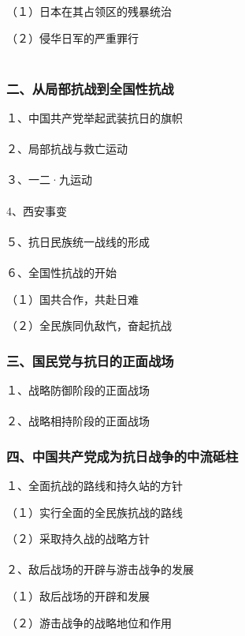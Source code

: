 \documentclass{ctexart}
\begin{document}
（１）日本在其占领区的残暴统治

（２）侵华日军的严重罪行
\\\\

\subsubsection{二、从局部抗战到全国性抗战}

１、中国共产党举起武装抗日的旗帜
\\\\

２、局部抗战与救亡运动
\\\\

３、一二·九运动
\\\\

4、西安事变
\\\\

５、抗日民族统一战线的形成
\\\\

６、全国性抗战的开始

（１）国共合作，共赴日难

（２）全民族同仇敌忾，奋起抗战

\subsubsection{三、国民党与抗日的正面战场}
１、战略防御阶段的正面战场
\\\\

２、战略相持阶段的正面战场

\subsubsection{四、中国共产党成为抗日战争的中流砥柱}

１、全面抗战的路线和持久站的方针

（１）实行全面的全民族抗战的路线

（２）采取持久战的战略方针
\\\\

２、敌后战场的开辟与游击战争的发展

（１）敌后战场的开辟和发展

（２）游击战争的战略地位和作用
\\\\
\end{document}
